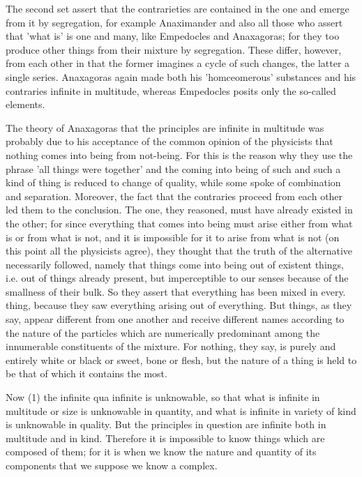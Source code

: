 The second set assert that the contrarieties are contained in the
one and emerge from it by segregation, for example Anaximander and
also all those who assert that 'what is' is one and many, like Empedocles
and Anaxagoras; for they too produce other things from their mixture
by segregation. These differ, however, from each other in that the
former imagines a cycle of such changes, the latter a single series.
Anaxagoras again made both his 'homceomerous' substances and his contraries
infinite in multitude, whereas Empedocles posits only the so-called
elements. 

The theory of Anaxagoras that the principles are infinite in multitude
was probably due to his acceptance of the common opinion of the physicists
that nothing comes into being from not-being. For this is the reason
why they use the phrase 'all things were together' and the coming
into being of such and such a kind of thing is reduced to change of
quality, while some spoke of combination and separation. Moreover,
the fact that the contraries proceed from each other led them to the
conclusion. The one, they reasoned, must have already existed in the
other; for since everything that comes into being must arise either
from what is or from what is not, and it is impossible for it to arise
from what is not (on this point all the physicists agree), they thought
that the truth of the alternative necessarily followed, namely that
things come into being out of existent things, i.e. out of things
already present, but imperceptible to our senses because of the smallness
of their bulk. So they assert that everything has been mixed in every.
thing, because they saw everything arising out of everything. But
things, as they say, appear different from one another and receive
different names according to the nature of the particles which are
numerically predominant among the innumerable constituents of the
mixture. For nothing, they say, is purely and entirely white or black
or sweet, bone or flesh, but the nature of a thing is held to be that
of which it contains the most. 

Now (1) the infinite qua infinite is unknowable, so that what is infinite
in multitude or size is unknowable in quantity, and what is infinite
in variety of kind is unknowable in quality. But the principles in
question are infinite both in multitude and in kind. Therefore it
is impossible to know things which are composed of them; for it is
when we know the nature and quantity of its components that we suppose
we know a complex. 

